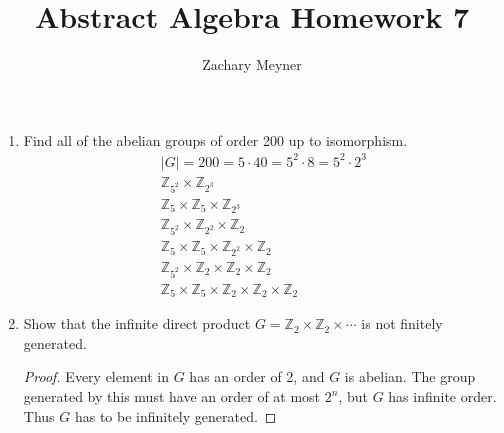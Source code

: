 \documentclass[12pt]{article}
\title{\large Abstract Algebra Homework 7}
\author{\large Zachary Meyner}
\date{}
\newcommand\setitemnumber[1]{\setcounter{enumi}{\numexpr#1-1\relax}}
\begin{document}
\maketitle

\begin{enumerate}
    \setitemnumber{2}
    \item Find all of the abelian groups of order 200 up to isomorphism. 
    \begin{gather*}
        |G| = 200 = 5 \cdot 40 = 5^2 \cdot 8 = 5^2 \cdot 2^3 \\
        \mathbb{Z}_{5^2} \times \mathbb{Z}_{2^3} \\
        \mathbb{Z}_5 \times \mathbb{Z}_5 \times \mathbb{Z}_{2^3} \\
        \mathbb{Z}_{5^2} \times \mathbb{Z}_{2^2} \times \mathbb{Z}_2 \\
        \mathbb{Z}_5 \times \mathbb{Z}_5 \times \mathbb{Z}_{2^2} \times \mathbb{Z}_2 \\
        \mathbb{Z}_{5^2} \times \mathbb{Z}_{2} \times \mathbb{Z}_2 \times \mathbb{Z}_2 \\
        \mathbb{Z}_{5} \times \mathbb{Z}_5 \times \mathbb{Z}_{2} \times \mathbb{Z}_2 \times \mathbb{Z}_2
    \end{gather*}

    \setitemnumber{5}
    \item Show that the infinite direct product $G = \mathbb{Z}_2 \times \mathbb{Z}_2 \times \cdots$ is not finitely generated.
    \begin{proof}
        Every element in $G$ has an order of 2, and $G$ is abelian. The group generated 
        by this must have an order of at most $2^n$, but $G$ has infinite order. Thus $G$ has to be 
        infinitely generated.
    \end{proof}
\end{enumerate}
\end{document}
